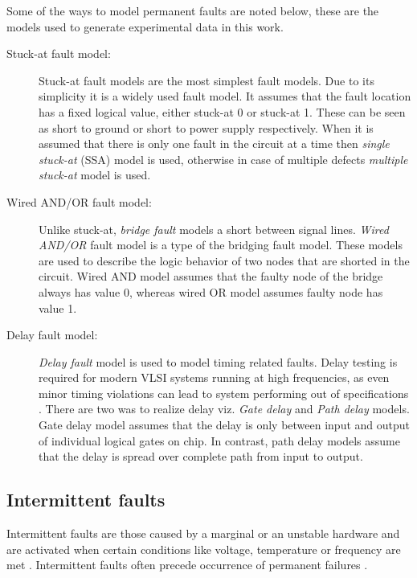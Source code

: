 Some of the ways to model permanent faults are noted below, these are the models used to generate experimental data in this work.
\begin{description}
\item[Stuck-at fault model:]
Stuck-at fault models are the most simplest fault models. Due to its simplicity it is a widely used fault model\cite{Larsson2006}. It assumes that the fault location has a fixed logical value, either stuck-at 0 or stuck-at 1. These can be seen as short to ground or short to power supply respectively. When it is assumed that there is only one fault in the circuit at a time then \emph{single stuck-at} (SSA) model is used, otherwise in case of multiple defects \emph{multiple stuck-at} model is used.

\item[Wired AND/OR fault model:]
Unlike stuck-at, \emph{bridge fault} models a short between signal lines. \emph{Wired AND/OR} fault model is a type of the bridging fault model. These models are used to describe the logic behavior of two nodes that are shorted in the circuit. Wired AND model assumes that the faulty node of the bridge always has value 0, whereas wired OR model assumes faulty node has value 1. 

\item[Delay fault model:]
\emph{Delay fault} model is used to model timing related faults. Delay testing is required for modern VLSI systems running at high frequencies, as even minor timing violations can lead to system performing out of specifications \cite{Larsson2006}. There are two was to realize delay viz. \emph{Gate delay} and \emph{Path delay} models. Gate delay model assumes that the delay is only between input and output of individual logical gates on chip. In contrast, path delay models assume that the delay is spread over complete path from input to output. 
\end{description}
\subsection{Intermittent faults}
\label{sec:secif}
Intermittent faults are those caused by a marginal or an unstable hardware and are activated when certain conditions like voltage, temperature or frequency are met \cite{Constantinescu2003, Lehtonen2009}. Intermittent faults often precede occurrence of permanent failures \cite{Lehtonen2009}.

